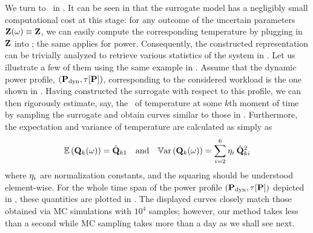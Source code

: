 

We turn to \ in .
It can be seen in  that the surrogate model has a negligibly small computational cost at this stage: for any outcome of the uncertain parameters $\mathbf{Z}(\omega) \equiv \mathbf{Z}$, we can easily compute the corresponding temperature by plugging in $\mathbf{Z}$ into ; the same applies for power.
Consequently, the constructed representation can be trivially analyzed to retrieve various statistics of the system in .
Let us illustrate a few of them using the same example in .
Assume that the dynamic power profile, $\profilePdyn$, corresponding to the considered workload is the one shown in .
Having constructed the surrogate with respect to this profile, we can then rigorously estimate, say, the \pdf\ of temperature at some $k$th moment of time by sampling the surrogate and obtain curves similar to those in .
Furthermore, the expectation and variance of temperature are calculated as simply as
\[
  \mathbb{E}\left(\mathbf{Q}_k(\omega)\right) = \hat{\mathbf{Q}}_{k1} \hspace{1em} \text{and} \hspace{1em} \mathbb{V}\text{ar}\left(\mathbf{Q}_k(\omega)\right) = \sum_{i = 2}^{6} \eta_i \: \hat{\mathbf{Q}}_{ki}^2
\]
where $\eta_i$ are normalization constants, and the squaring should be understood element-wise.
For the whole time span of the power profile $\profilePdyn$ depicted in , these quantities are plotted in .
The displayed curves closely match those obtained via MC simulations with $10^4$ samples; however, our method takes less than a second while MC sampling takes more than a day as we shall see next.
